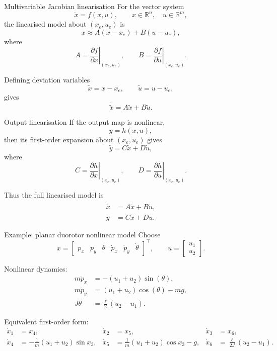 \documentclass[aspectratio=169,10pt]{beamer}
\newcommand{\R}{\mathbb{R}}
\newcommand{\T}{^\top}
\begin{document}
\begin{frame}{Multivariable Jacobian linearisation}
For the vector system
\[
\dot{x}=f(x,u),\qquad x\in\R^n,\quad u\in\R^m,
\]
the linearised model about \((x_e,u_e)\) is
\[
\dot{x}\approx A(x-x_e)+B(u-u_e),
\]
where
\[
A=\left.\frac{\partial f}{\partial x}\right|_{(x_e,u_e)},
\qquad
B=\left.\frac{\partial f}{\partial u}\right|_{(x_e,u_e)}.
\]

Defining deviation variables
\[
\tilde{x}=x-x_e,\qquad \tilde{u}=u-u_e,
\]
gives
\[
\dot{\tilde{x}}=A\tilde{x}+B\tilde{u}.
\]
\end{frame}

\begin{frame}{Output linearisation}
If the output map is nonlinear,
\[
y=h(x,u),
\]
then its first-order expansion about \((x_e,u_e)\) gives
\[
\tilde{y}=C\tilde{x}+D\tilde{u},
\]
where
\[
C=\left.\frac{\partial h}{\partial x}\right|_{(x_e,u_e)},
\qquad
D=\left.\frac{\partial h}{\partial u}\right|_{(x_e,u_e)}.
\]

Thus the full linearised model is
\begin{align*}
\dot{\tilde{x}} &= A\tilde{x}+B\tilde{u},\\
\tilde{y} &= C\tilde{x}+D\tilde{u}.
\end{align*}
\end{frame}

\begin{frame}{Example: planar duorotor nonlinear model}
Choose
\[
x=
\begin{bmatrix}
p_x & p_y & \theta & \dot{p}_x & \dot{p}_y & \dot{\theta}
\end{bmatrix}\T,
\qquad
u=
\begin{bmatrix}
u_1\\u_2
\end{bmatrix}.
\]

Nonlinear dynamics:
\begin{align*}
m\ddot{p}_x &= -(u_1+u_2)\sin(\theta),\\
m\ddot{p}_y &= (u_1+u_2)\cos(\theta)-mg,\\
J\ddot{\theta} &= \frac{\ell}{2}(u_2-u_1).
\end{align*}

Equivalent first-order form:
\begin{align*}
\dot{x}_1 &= x_4, &
\dot{x}_2 &= x_5, &
\dot{x}_3 &= x_6,\\
\dot{x}_4 &= -\frac{1}{m}(u_1+u_2)\sin x_3, &
\dot{x}_5 &= \frac{1}{m}(u_1+u_2)\cos x_3 - g, &
\dot{x}_6 &= \frac{\ell}{2J}(u_2-u_1).
\end{align*}
\end{frame}
\end{document}
